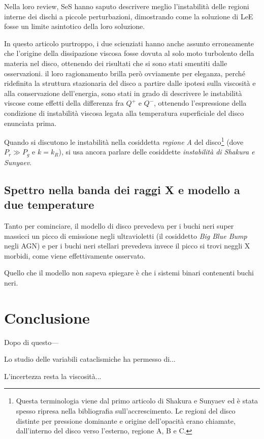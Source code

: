\documentclass[a4paperbi]{article}
\begin{document}
	 Nella loro review, SeS hanno saputo descrivere meglio l'instabilità delle regioni interne dei dischi a piccole perturbazioni, dimostrando come la soluzione di LeE fosse un limite asintotico della loro soluzione. 
	 
	 In questo articolo purtroppo, i due scienziati hanno anche assunto erroneamente che l'origine della dissipazione viscosa fosse dovuta al solo moto turbolento della materia nel disco, ottenendo dei risultati che si sono stati smentiti dalle osservazioni. il loro ragionamento brilla però ovviamente per eleganza, perché ridefinita la struttura stazionaria del disco a partire dalle ipotesi sulla viscosità e alla conservazione dell'energia, sono stati in grado di descrivere le instabilità viscose come effetti della differenza fra $Q^+$ e $Q^-$, ottenendo l'espressione della condizione di instabilità viscosa legata alla temperatura superficiale del disco enunciata prima.
	 
	 Quando si discutono le instabilità nella cosiddetta \textit{regione A} del disco\footnote{Questa terminologia viene dal primo articolo di Shakura e Sunyaev ed è stata spesso ripresa nella bibliografia sull'accrescimento. Le regioni del disco distinte per pressione dominante e origine dell'opacità erano chiamate, dall'interno del disco verso l'esterno, regione A, B e C.} (dove $P_r\gg P_g$ e $k=k_R$), si usa ancora parlare delle cosiddette \textit{instabilità di Shakura e Sunyaev}.
	
	\subsection{Spettro nella banda dei raggi X e modello a due temperature}	
	Tanto per cominciare, il modello di disco prevedeva per i buchi neri super massicci un picco di emissione negli ultravioletti (il cosiddetto \textit{Big Blue Bump} negli AGN) e per i buchi neri stellari prevedeva invece il picco si trovi neggli X morbidi, come viene effettivamente osservato. 
	
	Quello che il modello non sapeva spiegare è che i sistemi binari contenenti buchi neri.	
	 
\newpage
\section{Conclusione}
Dopo di questo---

Lo studio delle variabili cataclismiche ha permesso di...

L'incertezza resta la viscosità...
\end{document}

